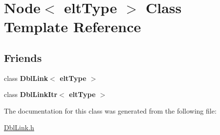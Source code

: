 \hypertarget{classNode}{\section{Node$<$ elt\-Type $>$ Class Template Reference}
\label{classNode}
}
\subsection*{Friends}
\begin{DoxyCompactItemize}
\item 
\hypertarget{classNode_a633d28fd34fd4343a6788b6eeb70f18f}{class {\bfseries Dbl\-Link$<$ elt\-Type $>$}}\label{classNode_a633d28fd34fd4343a6788b6eeb70f18f}

\item 
\hypertarget{classNode_a15e9b1e37fae72414617320686b8b4f0}{class {\bfseries Dbl\-Link\-Itr$<$ elt\-Type $>$}}\label{classNode_a15e9b1e37fae72414617320686b8b4f0}

\end{DoxyCompactItemize}


The documentation for this class was generated from the following file\-:\begin{DoxyCompactItemize}
\item 
\hyperlink{DblLink_8h}{Dbl\-Link.\-h}\end{DoxyCompactItemize}
